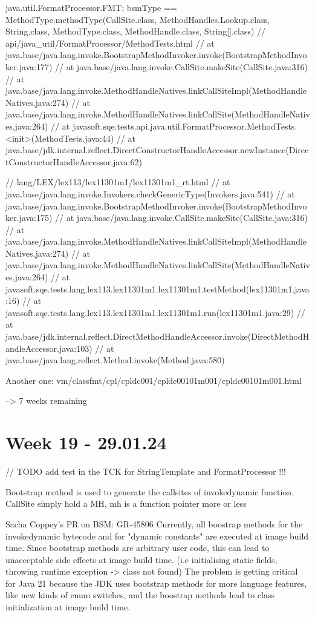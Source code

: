 java.util.FormatProcessor.FMT:
bsmType == MethodType.methodType(CallSite.class, MethodHandles.Lookup.class, String.class, MethodType.class, MethodHandle.class, String[].class)
//        api/java_util/FormatProcessor/MethodTests.html
//        at java.base/java.lang.invoke.BootstrapMethodInvoker.invoke(BootstrapMethodInvoker.java:177)
//        at java.base/java.lang.invoke.CallSite.makeSite(CallSite.java:316)
//        at java.base/java.lang.invoke.MethodHandleNatives.linkCallSiteImpl(MethodHandleNatives.java:274)
//        at java.base/java.lang.invoke.MethodHandleNatives.linkCallSite(MethodHandleNatives.java:264)
//        at javasoft.sqe.tests.api.java.util.FormatProcessor.MethodTests.<init>(MethodTests.java:44)
//        at java.base/jdk.internal.reflect.DirectConstructorHandleAccessor.newInstance(DirectConstructorHandleAccessor.java:62)

//        lang/LEX/lex113/lex11301m1/lex11301m1_rt.html
//        at java.base/java.lang.invoke.Invokers.checkGenericType(Invokers.java:541)
//        at java.base/java.lang.invoke.BootstrapMethodInvoker.invoke(BootstrapMethodInvoker.java:175)
//        at java.base/java.lang.invoke.CallSite.makeSite(CallSite.java:316)
//        at java.base/java.lang.invoke.MethodHandleNatives.linkCallSiteImpl(MethodHandleNatives.java:274)
//        at java.base/java.lang.invoke.MethodHandleNatives.linkCallSite(MethodHandleNatives.java:264)
//        at javasoft.sqe.tests.lang.lex113.lex11301m1.lex11301m1.testMethod(lex11301m1.java:16)
//        at javasoft.sqe.tests.lang.lex113.lex11301m1.lex11301m1.run(lex11301m1.java:29)
//        at java.base/jdk.internal.reflect.DirectMethodHandleAccessor.invoke(DirectMethodHandleAccessor.java:103)
//        at java.base/java.lang.reflect.Method.invoke(Method.java:580)

Another one:
vm/classfmt/cpl/cpldc001/cpldc00101m001/cpldc00101m001.html

--> 7 weeks remaining

\section{Week 19 - 29.01.24}
// TODO add test in the TCK for StringTemplate and FormatProcessor !!!

Bootstrap method is used to generate the callsites of invokedynamic function. CallSite simply hold a MH, mh is a function pointer more or less

Sacha Coppey's PR on BSM: GR-45806
Currently, all boostrap methods for the invokedynamic bytecode and for "dynamic constants" are executed at image build time. Since bootstrap methods are arbitrary user code, this can lead to unacceptable side effects at image build time. (i.e initialising static fields, throwing runtime exception -> class not found)
The problem is getting critical for Java 21 because the JDK uses bootstrap methods for more language features, like new kinds of enum switches, and the boostrap methods lead to class initialization at image build time.

